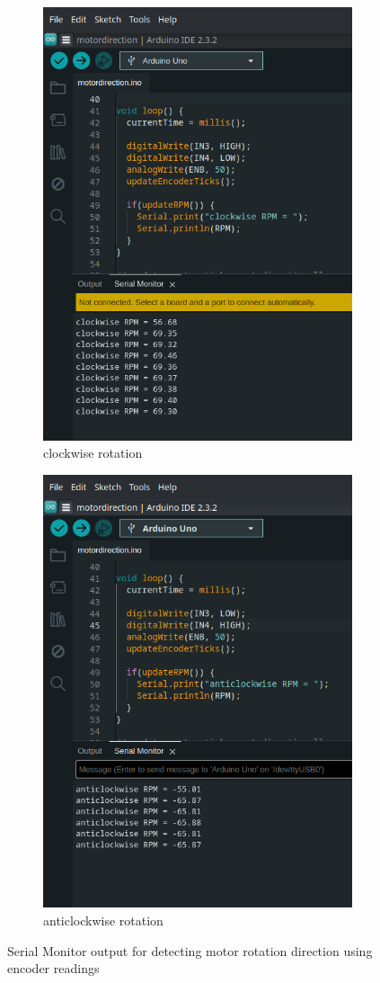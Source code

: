 \documentclass[12pt]{article}
\begin{document}
\begin{figure}[h]
    \centering
    \begin{subfigure}{.45\textwidth}
        \centering
        \includegraphics[width=0.75\linewidth]{images/clock.png}
        \caption{clockwise rotation}
    \end{subfigure}
    \begin{subfigure}{.45\textwidth}
        \centering
        \includegraphics[width=0.75\linewidth]{images/aclock.png}
        \caption{anticlockwise rotation}
    \end{subfigure}
    \caption{Serial Monitor output for detecting motor rotation direction using encoder readings}
\end{figure}
\end{document}

